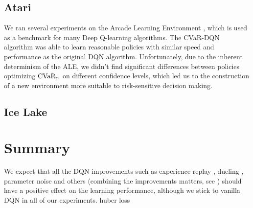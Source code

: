 \subsection{Atari}
We ran several experiments on the Arcade Learning Environment \citep{bellemare13arcade}, which is used as a benchmark for many Deep Q-learning algorithms. The CVaR-DQN algorithm was able to learn reasonable policies with similar speed and performance as the original DQN algorithm. Unfortunately, due to the inherent determinism of the ALE, we didn't find significant differences between policies optimizing $\text{CVaR}_\alpha$ on different confidence levels, which led us to the construction of a new environment more suitable to risk-sensitive decision making.

\subsection{Ice Lake}


\section{Summary}
We expect that all the DQN improvements such as experience replay \citep{hessel2017rainbow}, dueling \citep{wang2015dueling}, parameter noise \citep{plappert2017parameter} and others (combining the improvements matters, see \citep{hessel2017rainbow}) should have a positive effect on the learning performance, although we stick to vanilla DQN in all of our experiments. huber loss

